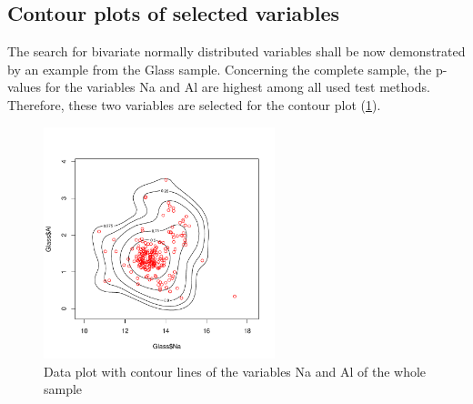 \documentclass[a4paper, 12pt, titlepage, headsepline, listof = totoc, bibliography = totoc, numbers = noenddot]{scrartcl}
\begin{document}

%
%
\subsection{Contour plots of selected variables}

The search for bivariate normally distributed variables shall be now demonstrated by an example from the Glass sample. Concerning the complete sample, the p-values for the variables Na and Al are highest among all used test methods. Therefore, these two variables are selected for the contour plot (\ref{fig:contourGlassNaAl}).

\begin{figure}[h!]
\centering
\includegraphics[width=0.6\textwidth]{report-contourGlassNaAl}
\caption{Data plot with contour lines of the variables Na and Al of the whole sample}
\label{fig:contourGlassNaAl}
\end{figure}
\end{document}
